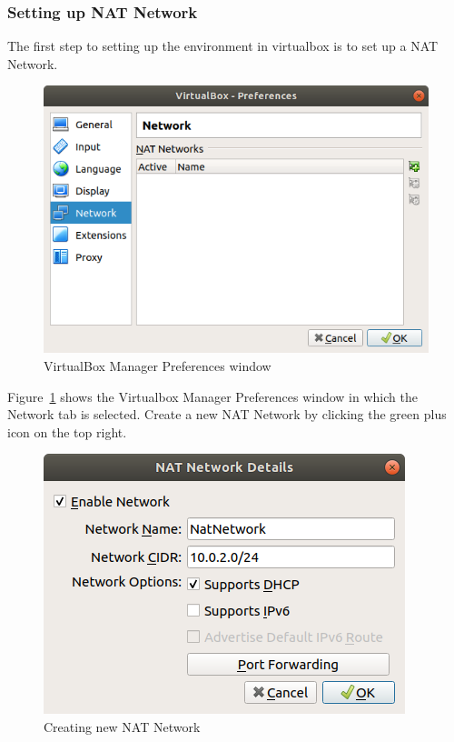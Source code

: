 \documentclass[12pt]{article}
\begin{document}
\subsubsection{Setting up NAT Network}
    The first step to setting up the environment in virtualbox is to set up a NAT Network.
    
    
    \begin{figure}[H]
        \begin{center}
            \includegraphics[scale=0.5]{NATNetwork_1.png}
        \end{center}{}
        \caption{VirtualBox Manager Preferences window}
        \label{fig:t1_2}
    \end{figure}
    
    Figure~\ref{fig:t1_2} shows the Virtualbox Manager Preferences window in which the Network tab is selected. Create a new NAT Network by clicking the green plus icon on the top right. 
    
    \begin{figure}[H]
        \begin{center}
            \includegraphics[scale=0.5]{NATNetwork_2.png}
        \end{center}{}
        \caption{Creating new NAT Network}
        \label{fig:t1_3}
    \end{figure}
    
\end{document}
